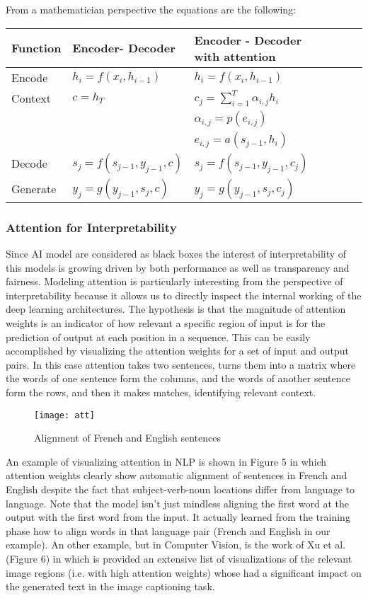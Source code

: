 \documentclass[11pt]{article}
\begin{document}
\noindent From a mathematician perspective the equations are the following:
\begin{center} 
\begin{tabular}{ l l l l l l |}
Function & Encoder- Decoder & Encoder - Decoder with attention \\
\hline 
Encode    & $h_i = f(x_i, h_{i-1})$ 		& $h_i = f(x_i, h_{i-1})$ \\
Context    & $c=h_T$                    		& $ c_j = \sum_{i=1}^T \alpha_{i,j} h_i$ \\
                & 						 & $ \alpha_{i,j} = p(e_{i,j})$ \\
                &						 & $e_{i,j} = a(s_{j-1}, h_i)$ \\ %
Decode    & $s_j = f (s_{j-1}, y_{j-1}, c)$ 	 & $s_j = f(s_{j-1}, y_{j-1}, c_j)$ \\
Generate & $ y_j = g(y_{j-1}, s_j, c)$		& $ y_j = g(y_{j-1}, s_j, c_j)$	
\end{tabular}
\end{center} 

\subsubsection{Attention for Interpretability}
Since AI model are considered as black boxes the interest of  interpretability of this models is growing driven by both performance as well as transparency and fairness. Modeling attention is particularly interesting from the perspective of interpretability because it allows us to directly inspect the internal working of the deep learning architectures. The hypothesis is that the magnitude of attention weights is an indicator of how relevant a specific region of input is for the prediction of output at each position in a sequence. This can be easily accomplished by visualizing the attention weights for a set of input and output pairs. In this case attention takes two sentences, turns them into a matrix where the words of one sentence form the columns, and the words of another sentence form the rows, and then it makes matches, identifying relevant context.

\begin{figure}[h]
\centerline{\texttt{[image: att]}}
\caption{Alignment of French and English sentences}
\label{fig}
\end{figure}

\noindent An example of visualizing attention in NLP is shown in Figure 5 \cite{Bahdanau} in which attention weights clearly show automatic alignment of sentences in French and English despite the fact that subject-verb-noun locations differ from language to language.  Note that the model isn’t just mindless aligning the first word at the output with the first word from the input. It actually learned from the training phase how to align words in that language pair (French and English in our example). An other example, but in Computer Vision, is the work of Xu et al. \cite{xu} (Figure 6) in which is provided an extensive list of visualizations of the relevant image regions (i.e. with high attention weights) whose had a significant impact on the generated text in the image captioning task.
\end{document}
